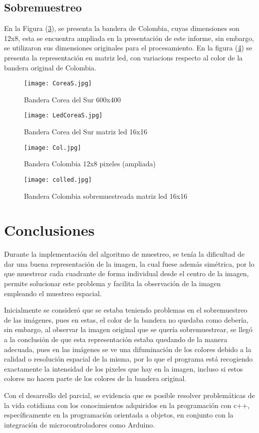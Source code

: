 \documentclass{article}
\begin{document}
\subsection{Sobremuestreo}
En la Figura (\ref{fig:Colombia}), se presenta la bandera de Colombia, cuyas dimensiones son 12x8, esta se encuentra ampliada en la presentación de este informe, sin embargo, se utilizaron sus dimensiones originales para el procesamiento. En la figura (\ref{fig:Colombialed}) se presenta la representación en matriz led, con variacions respecto al color de la bandera original de Colombia.
\begin{figure}[h]
\texttt{[image: CoreaS.jpg]}
\centering
\caption{Bandera Corea del Sur 600x400}
\label{fig:CoreaS}
\end{figure}
\begin{figure}[h]
\texttt{[image: LedCoreaS.jpg]}
\centering
\caption{Bandera Corea del Sur matriz led 16x16}
\label{fig:CoreaSled}
\end{figure}

\begin{figure}[h]
\texttt{[image: Col.jpg]}
\centering
\caption{Bandera Colombia 12x8 pixeles (ampliada)}
\label{fig:Colombia}
\end{figure}

\begin{figure}[h]
\texttt{[image: colled.jpg]}
\centering
\caption{Bandera Colombia sobremuestreada matriz led 16x16}
\label{fig:Colombialed}
\end{figure}

\section{Conclusiones}
Durante la implementación del algoritmo de muestreo, se tenía la dificultad de dar una buena representación de la imagen, la cual fuese además simétrica, por lo que muestrear cada cuadrante de forma individual desde el centro de la imagen, permite solucionar este problema y facilita la observación de la imagen empleando el muestreo espacial.

Inicialmente se consideró que se estaba teniendo problemas en el sobremuestreo de las imágenes, pues en estas, el color de la bandera no quedaba como debería, sin embargo, al observar la imagen original que se quería sobremuestrear, se llegó a la conclusión de que esta representación estaba quedando de la manera adecuada, pues en las imágenes se ve una difuminación de los colores debido a la calidad o resolución espacial de la misma, por lo que el programa está recogiendo exactamente la intensidad de los pixeles que hay en la imagen, incluso si estos colores no hacen parte de los colores de la bandera original.

Con el desarrollo del parcial, se evidencia que es posible resolver problemáticas de la vida cotidiana con los conocimientos adquiridos en la programación con c++, específicamente en la programación orientada a objetos, en conjunto con la integración de microcontroladores como Arduino.
\end{document}
